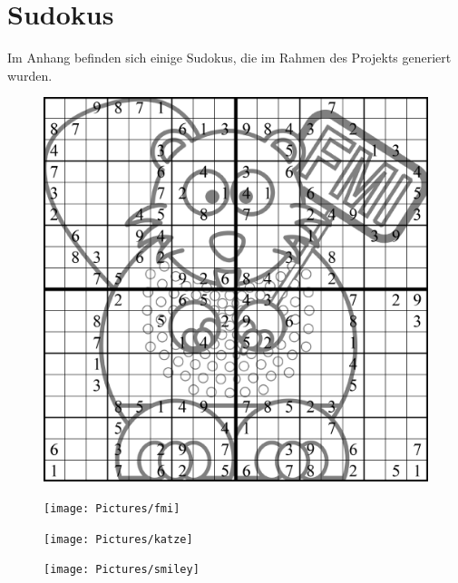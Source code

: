 \newpage
\appendix
\section{Sudokus}
Im Anhang befinden sich einige Sudokus, die im Rahmen des Projekts generiert wurden.

\begin{figure}[h!]
\centering
\includegraphics[width=1\textwidth]{Pictures/beaver}
\end{figure}

\begin{figure}[h!]
    \centering
    \texttt{[image: Pictures/fmi]}
\end{figure}

\begin{figure}[h!]
    \centering
    \texttt{[image: Pictures/katze]}
\end{figure}

\begin{figure}[h!]
    \centering
    \texttt{[image: Pictures/smiley]}
\end{figure}